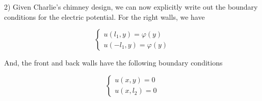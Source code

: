\documentclass[executivepaper]{article}
\begin{document}
\begin{flushleft}

2) Given Charlie's chimney design, we can now explicitly write out the boundary conditions for the electric potential. For the right walls, we have

\begin{center}

\[ \begin{cases} 
      u(l_{1}, y)=\varphi(y)\\
      u(-l_{1}, y)=\varphi(y)
   \end{cases}
\]

\end{center}

And, the front and back walls have the following boundary conditions

\begin{center}

\[ \begin{cases} 
      u(x, y)=0\\
      u(x, l_{2})=0
   \end{cases}
\]

\end{center}

\end{flushleft}
\end{document}
